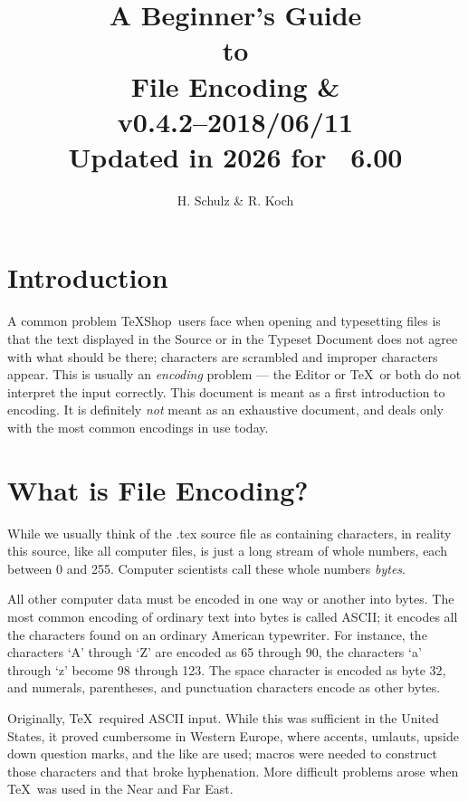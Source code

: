 \documentclass[letterpaper,11pt]{article}
\title{A Beginner's Guide\\to\\File Encoding \& \TS\\\small v0.4.2--2018/06/11\\Updated in 2026 for \TS\ 6.00}
\author{H. Schulz \& R. Koch}
\date{}
\newcommand{\TS}{\textsf{\TeX Shop}}
\newcommand{\acr}[1]{\textsf{#1}}
\newcommand{\cmd}[1]{\textsf{#1}}
\begin{document}
\maketitle


\section{Introduction}
A common problem \TS\ users face when opening and typesetting files is that the text displayed in the Source or in the Typeset Document does not agree with what should be there; characters are scrambled and  improper characters appear. This is usually an \emph{encoding} problem ---  the Editor or \TeX\ or both do not interpret the input correctly. This document is meant as a first introduction to encoding. It is definitely \emph{not} meant as an exhaustive document, and deals only with the most common encodings in use today.

\section{What is File Encoding?}
While we usually think of the \cmd{.tex} source file as containing characters, in reality this source, like all computer files, is just a long stream of whole numbers, each between 0 and 255. 
Computer scientists call these whole numbers {\em bytes}. 

All other computer data must be encoded in one way or another into bytes. The most common encoding of ordinary text into bytes is called \acr{ASCII}; it encodes all the characters found on an ordinary American typewriter. For instance, the characters `A' through `Z' are encoded as 65 through 90,  the characters `a' through `z' become 98 through 123. The space character is encoded as byte 32, and numerals, parentheses, and punctuation characters encode as other bytes.

Originally, \TeX\ required \acr{ASCII} input. While this was sufficient in the United States, it proved cumbersome in Western Europe, where accents, umlauts, upside down question marks, and the like are used; macros were needed to construct those characters and that broke hyphenation. More difficult problems arose when \TeX\ was used in the Near and Far East.
\end{document}
